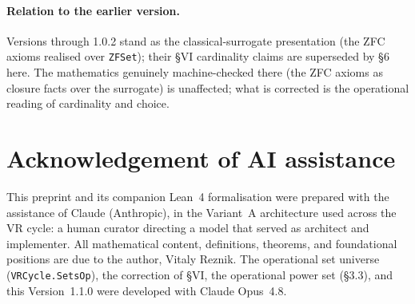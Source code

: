 \documentclass[11pt]{article}
\theoremstyle{remark}
\begin{document}
\paragraph{Relation to the earlier version.} Versions through 1.0.2 stand as the classical-surrogate
presentation (the ZFC axioms realised over \texttt{ZFSet}); their \S VI cardinality claims are
superseded by \S6 here. The mathematics genuinely machine-checked there (the ZFC axioms as closure
facts over the surrogate) is unaffected; what is corrected is the operational reading of cardinality
and choice.

\section*{Acknowledgement of AI assistance}
This preprint and its companion Lean~4 formalisation were prepared with the assistance of Claude
(Anthropic), in the Variant~A architecture used across the VR cycle: a human curator directing a
model that served as architect and implementer. All mathematical content, definitions, theorems, and
foundational positions are due to the author, Vitaly Reznik. The operational set universe
(\texttt{VRCycle.SetsOp}), the correction of \S VI, the operational power set (\S3.3), and this
Version~1.1.0 were developed with Claude Opus~4.8.
\end{document}
